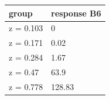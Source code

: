 \begingroup\small
\setlength{\tabcolsep}{3pt}
\renewcommand{\arraystretch}{1.04}
\begin{tabularx}{\linewidth}{XX}
\toprule
group & response B6 \\
\midrule
z = 0.103 & 0 \\
z = 0.171 & 0.02 \\
z = 0.284 & 1.67 \\
z = 0.47 & 63.9 \\
z = 0.778 & 128.83 \\
\bottomrule
\end{tabularx}
\endgroup
